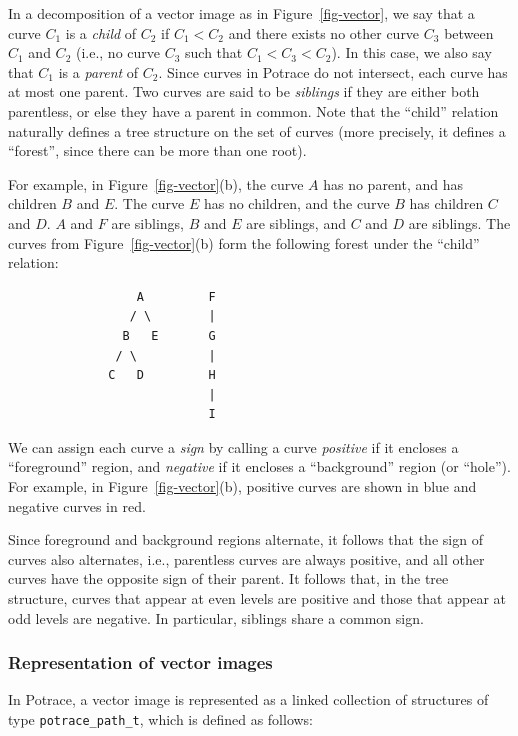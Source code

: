 \documentclass{article}
\begin{document}
In a decomposition of a vector image as in Figure~\ref{fig-vector}, we
say that a curve $C_1$ is a {\em child} of $C_2$ if $C_1 < C_2$ and
there exists no other curve $C_3$ between $C_1$ and $C_2$ (i.e., no
curve $C_3$ such that $C_1 < C_3 < C_2$). In this case, we also say
that $C_1$ is a {\em parent} of $C_2$. Since curves in Potrace do not
intersect, each curve has at most one parent.  Two curves are said to
be {\em siblings} if they are either both parentless, or else they
have a parent in common. Note that the ``child'' relation naturally
defines a tree structure on the set of curves (more precisely, it
defines a ``forest'', since there can be more than one root).

For example, in Figure~\ref{fig-vector}(b), the curve $A$ has no
parent, and has children $B$ and $E$. The curve $E$ has no children,
and the curve $B$ has children $C$ and $D$. $A$ and $F$ are siblings,
$B$ and $E$ are siblings, and $C$ and $D$ are siblings. The curves
from Figure~\ref{fig-vector}(b) form the following forest under the
``child'' relation:

\begin{verbatim}
                  A         F
                 / \        |
                B   E       G
               / \          |
              C   D         H
                            |
                            I
\end{verbatim}

We can assign each curve a {\em sign} by calling a curve {\em
  positive} if it encloses a ``foreground'' region, and {\em negative}
if it encloses a ``background'' region (or ``hole''). For example, in
Figure~\ref{fig-vector}(b), positive curves are shown in blue and
negative curves in red.

Since foreground and background regions alternate, it follows that the
sign of curves also alternates, i.e., parentless curves are always
positive, and all other curves have the opposite sign of their parent.
It follows that, in the tree structure, curves that appear at even
levels are positive and those that appear at odd levels are negative.
In particular, siblings share a common sign.

\subsubsection{Representation of vector images}\label{sssec-vector}

In Potrace, a vector image is represented as a linked collection of
structures of type \verb!potrace_path_t!, which is defined as follows:
\end{document}
